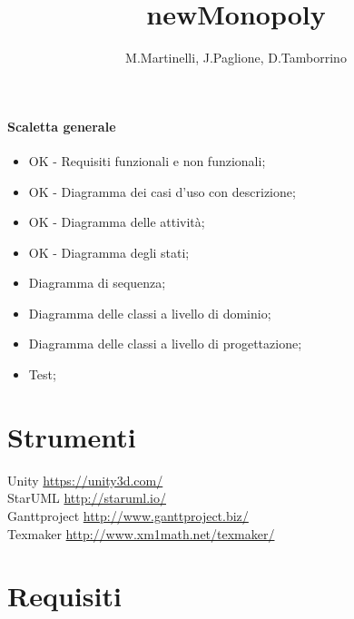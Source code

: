 \documentclass[a4paper]{article}
\title{\textbf{newMonopoly}}
\author{M.Martinelli, J.Paglione, D.Tamborrino}
\begin{document}
\maketitle

\newpage
\tableofcontents

\paragraph{Scaletta generale}
\begin{itemize}
\item OK - Requisiti funzionali e non funzionali;
\item OK - Diagramma dei casi d'uso con descrizione;
\item OK - Diagramma delle attività;
\item OK - Diagramma degli stati;
\item Diagramma di sequenza;
\item Diagramma delle classi a livello di dominio;
\item Diagramma delle classi a livello di progettazione;
\item Test;
\end{itemize}


\newpage
\section{Strumenti}
Unity \href{https://unity3d.com/}{https://unity3d.com/}\\
StarUML \href{http://staruml.io/}{http://staruml.io/}\\
Ganttproject \href{http://www.ganttproject.biz/}{http://www.ganttproject.biz/}\\
Texmaker \href{http://www.xm1math.net/texmaker/}{http://www.xm1math.net/texmaker/}
\section{Requisiti}
\end{document}
